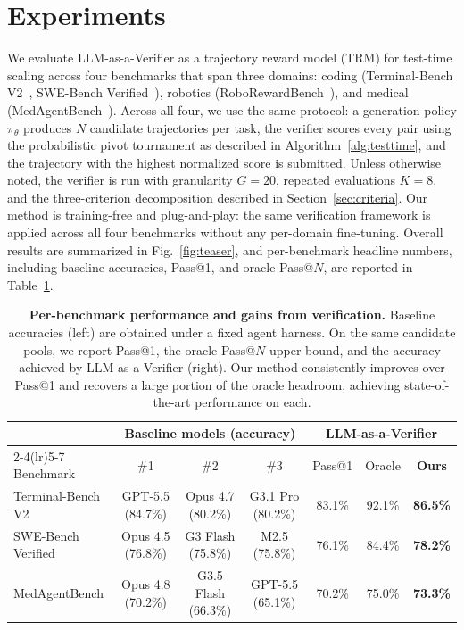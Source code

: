 \section{Experiments}
\label{sec:experiments}

We evaluate LLM-as-a-Verifier as a trajectory reward model (TRM) for test-time scaling across four benchmarks that span three domains: coding (Terminal-Bench V2~\citep{merrill_terminal-bench_2026}, SWE-Bench Verified~\citep{jimenez_swe-bench_2024}), robotics (RoboRewardBench~\citep{lee2026roboreward}), and medical (MedAgentBench~\citep{jiang2025virtual}). Across all four, we use the same protocol: a generation policy $\pi_\theta$ produces $N$ candidate trajectories per task, the verifier scores every pair using the probabilistic pivot tournament as described in Algorithm~\ref{alg:testtime}, and the trajectory with the highest normalized score is submitted. Unless otherwise noted, the verifier is run with granularity $G{=}20$, repeated evaluations $K{=}8$, and the three-criterion decomposition described in Section~\ref{sec:criteria}. Our method is training-free and plug-and-play: the same verification framework is applied across all four benchmarks without any per-domain fine-tuning. Overall results are summarized in Fig.~\ref{fig:teaser}, and per-benchmark headline numbers, including baseline accuracies, Pass@1, and oracle Pass@$N$, are reported in Table~\ref{tab:per-bench-headline}.

\begin{table}[h]
\centering
\caption{\textbf{Per-benchmark performance and gains from verification.} Baseline accuracies (left) are obtained under a fixed agent harness. On the same candidate pools, we report Pass@1, the oracle Pass@$N$ upper bound, and the accuracy achieved by LLM-as-a-Verifier (right). Our method consistently improves over Pass@1 and recovers a large portion of the oracle headroom, achieving state-of-the-art performance on each.}
\label{tab:per-bench-headline}
\small
\setlength{\tabcolsep}{4pt}
\begin{tabular}{l ccc ccc}
\toprule
 & \multicolumn{3}{c}{\textbf{Baseline models (accuracy)}} & \multicolumn{3}{c}{\textbf{LLM-as-a-Verifier}} \\
\cmidrule(lr){2-4}\cmidrule(lr){5-7}
Benchmark & \#1 & \#2 & \#3 & Pass@1 & Oracle & \textbf{Ours} \\
\midrule
Terminal-Bench V2  & GPT-5.5 (84.7\%)        & Opus 4.7 (80.2\%) & G3.1 Pro (80.2\%) & 83.1\% & 92.1\% & \textbf{86.5\%} \\
SWE-Bench Verified & Opus 4.5 (76.8\%)       & G3 Flash (75.8\%)        & M2.5 (75.8\%)           & 76.1\% & 84.4\% & \textbf{78.2\%} \\
MedAgentBench      & Opus 4.8 (70.2\%)       & G3.5 Flash (66.3\%)        & GPT-5.5 (65.1\%)       & 70.2\% & 75.0\% & \textbf{73.3\%} \\
\bottomrule
\end{tabular}
\end{table}

